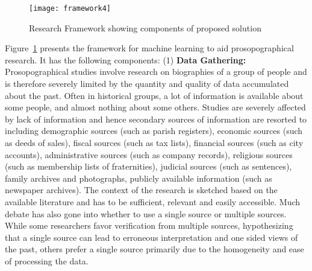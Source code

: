 \begin{figure}
\centering
\texttt{[image: framework4]}
\caption{Research Framework showing components of proposed solution}
\label{fig:framework}
\vspace{-10pt}
\end{figure}
Figure~\ref{fig:framework} presents the framework for machine learning to aid prosopographical research. It has the following components:
(1)  \textbf{Data Gathering: } Prosopographical studies involve research on biographies of a group of people and is therefore severely limited by the quantity and quality of data accumulated about the past. Often in historical groups, a lot of information is available about some people, and almost nothing about some others. Studies are severely affected by lack of information and hence secondary sources of information are resorted to including demographic sources (such as parish registers), economic sources (such as deeds of sales), fiscal sources (such as tax lists), financial sources (such as city accounts), administrative sources (such as company records), religious sources (such as membership lists of fraternities), judicial sources (such as sentences), family archives and photographs, publicly available information (such as newspaper archives). The context of the research is sketched based on the available literature and has to be sufficient, relevant and easily accessible. Much debate has also gone into whether to use a single source or multiple sources. While some researchers favor verification from multiple sources, hypothesizing that a single source can lead to erroneous interpretation and one sided views of the past, others prefer a single source primarily due to the homogeneity and ease of processing the data. 

